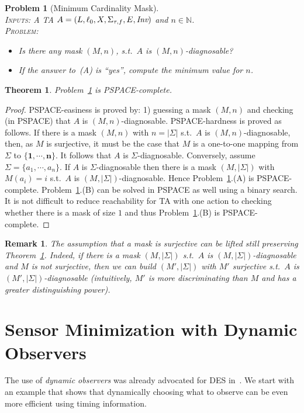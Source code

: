\documentclass[letterpaper,10pt,conference]{ieeeconf}  \IEEEoverridecommandlockouts                              \overrideIEEEmargins
\def\st{{s.t.}~}
\newtheorem{prob}{Problem}  \newtheorem{definition}{Definition}
\newtheorem{theorem}{Theorem}
\newtheorem{remark}{Remark}
\newcommand{\setN}{\mathbb N}
\def\tauac{\tau}
\begin{document}
\begin{prob}[Minimum Cardinality Mask] \label{prob-static-mask} \mbox{} \\
  \textsc{Inputs:} A  TA $A=(L,\ell_0,X,\Sigma_{\tauac,f},E,\inv)$ and $n \in \setN$. \\
  \textsc{Problem:}
  \begin{itemize}
  \item[(A)] Is there any mask $(M,n)$, \st $A$ is $(M,n)$-diagnosable?
  \item[(B)] If the answer to~(A) is ``yes'', compute the minimum value for $n$.
  \end{itemize}
\end{prob}
\begin{theorem}\label{thm-mask}
  Problem~\ref{prob-static-mask} is PSPACE-complete.
\end{theorem}
\begin{proof}
  PSPACE-easiness is proved by: 1) guessing a mask $(M,n)$ and
  checking (in PSPACE) that $A$ is $(M,n)$-diagnosable.
  PSPACE-hardness is proved as follows.  If there is a mask $(M,n)$
  with $n=|\Sigma|$ \st $A$ is $(M,n)$-diagnosable, then, as $M$ is
  surjective, it must be the case that $M$ is a one-to-one mapping
  from $\Sigma$ to $\{\mathbf{1},\cdots,\mathbf{n}\}$. It follows that
  $A$ is $\Sigma$-diagnosable.  Conversely, assume
  $\Sigma=\{a_1,\cdots,a_n\}$.  If $A$ is $\Sigma$-diagnosable then
  there is a mask $(M,|\Sigma|)$ with $M(a_i)=i$ \st $A$ is
  $(M,|\Sigma|)$-diagnosable.  Hence
  Problem~\ref{prob-static-mask}.(A) is PSPACE-complete.
  Problem~\ref{prob-static-mask}.(B) can be solved in PSPACE as well
  using a binary search. It is not difficult to reduce reachability
  for TA with one action to checking whether there is a mask of size
  $1$ and thus Problem~\ref{prob-static-mask}.(B) is PSPACE-complete.
\end{proof}
\begin{remark}
  The assumption that a mask is surjective can be lifted still
  preserving Theorem~\ref{thm-mask}. Indeed, if there is a mask
  $(M,|\Sigma|)$ \st $A$ is $(M,|\Sigma|)$-diagnosable and $M$ is not
  surjective, then we can build $(M',|\Sigma|)$ with $M'$ surjective
  \st $A$ is $(M',|\Sigma|)$-diagnosable (intuitively, $M'$ is more
  discriminating than $M$ and has a greater distinguishing power).
\end{remark}

\section{Sensor Minimization with Dynamic Observers}
\label{sec-dynamic}
The use of \emph{dynamic observers} was already advocated for DES
in~\cite{cassez-acsd-07,cassez-fi-08}.  We start with an example that
shows that dynamically choosing what to observe can be even more
efficient using timing information.
\end{document}
